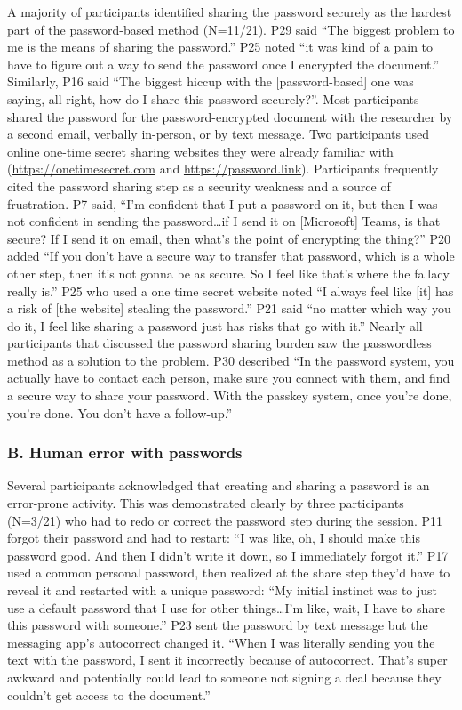 A majority of participants identified sharing the password securely as the hardest part of the password-based method (N=11/21). P29 said ``The biggest problem to me is the means of sharing the password.'' P25 noted ``it was kind of a pain to have to figure out a way to send the password once I encrypted the document.'' Similarly, P16 said ``The biggest hiccup with the [password-based] one was saying, all right, how do I share this password securely?''. Most participants shared the password for the password-encrypted document with the researcher by a second email, verbally in-person, or by text message. Two participants used online one-time secret sharing websites they were already familiar with (\url{https://onetimesecret.com} and \url{https://password.link}). Participants frequently cited the password sharing step as a security weakness and a source of frustration. P7 said, ``I'm confident that I put a password on it, but then I was not confident in sending the password\ldots if I send it on [Microsoft] Teams, is that secure? If I send it on email, then what's the point of encrypting the thing?'' P20 added ``If you don't have a secure way to transfer that password, which is a whole other step, then it's not gonna be as secure. So I feel like that's where the fallacy really is.'' P25 who used a one time secret website noted ``I always feel like [it] has a risk of [the website] stealing the password.'' P21 said ``no matter which way you do it, I feel like sharing a password just has risks that go with it.'' Nearly all participants that discussed the password sharing burden saw the passwordless method as a solution to the problem. P30 described ``In the password system, you actually have to contact each person, make sure you connect with them, and find a secure way to share your password. With the passkey system, once you're done, you're done. You don't have a follow-up.''

\subsubsection*{B. Human error with passwords}

Several participants acknowledged that creating and sharing a password is an error-prone activity. This was demonstrated clearly by three participants (N=3/21) who had to redo or correct the password step during the session. P11 forgot their password and had to restart: ``I was like, oh, I should make this password good. And then I didn't write it down, so I immediately forgot it.'' P17 used a common personal password, then realized at the share step they'd have to reveal it and restarted with a unique password: ``My initial instinct was to just use a default password that I use for other things\ldots I'm like, wait, I have to share this password with someone.'' P23 sent the password by text message but the messaging app's autocorrect changed it. ``When I was literally sending you the text with the password, I sent it incorrectly because of autocorrect. That's super awkward and potentially could lead to someone not signing a deal because they couldn't get access to the document.''

